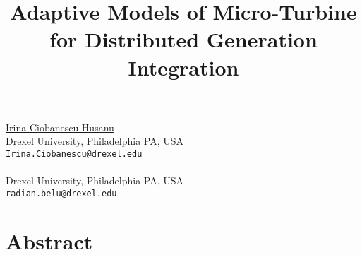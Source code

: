\title{Adaptive Models of Micro-Turbine for Distributed Generation Integration}
\author{}  \institute{}
\maketitle
\begin{center}
{\large \underline{Irina Ciobanescu Husanu}}\\
Drexel University, Philadelphia PA, USA\\
{\tt Irina.Ciobanescu@drexel.edu}
\\ \vspace{4mm}{\large Radian Belu}\\
Drexel University, Philadelphia PA, USA\\
{\tt radian.belu@drexel.edu}

\end{center}

\section*{Abstract}

